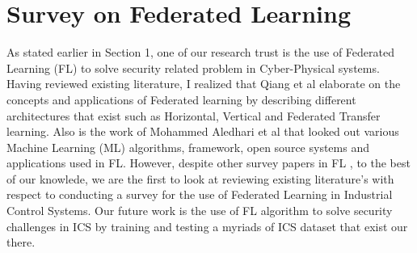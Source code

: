 %



\section{Survey on Federated Learning}
As stated earlier in Section 1, one of our research trust is the use of Federated Learning (FL) to solve security related problem in Cyber-Physical systems. Having reviewed existing literature, I realized that Qiang et al\cite{b3} elaborate on the concepts and applications of Federated learning by describing different architectures that exist such as Horizontal, Vertical and Federated Transfer learning. Also is the work of Mohammed Aledhari et al that looked out various Machine Learning (ML) algorithms, framework, open source systems and applications used in FL\cite{b7}. However, despite other survey papers in FL \cite{b17, b14, b16, b8,b9,b11}, to the best of our knowlede, we are the first to look at reviewing existing literature's with respect to conducting a survey for the use of Federated Learning in Industrial Control Systems. Our future work is the use of FL algorithm to solve security challenges in ICS by training and testing a myriads of ICS dataset that exist our there.
